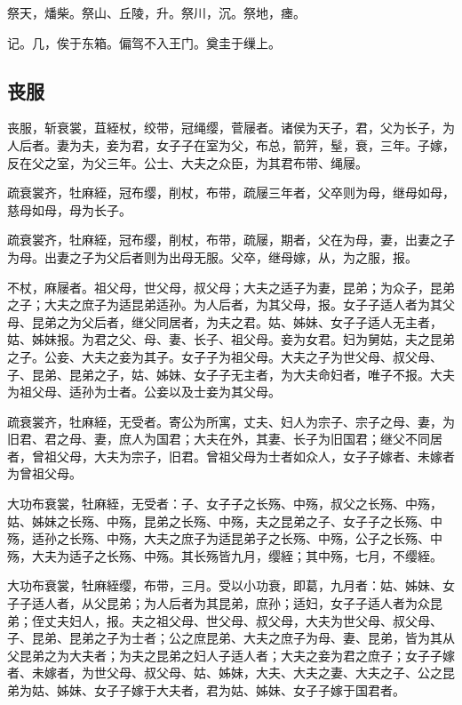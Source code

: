 \documentclass[]{article}
\begin{document}
祭天，燔柴。祭山、丘陵，升。祭川，沉。祭地，瘗。

记。几，俟于东箱。偏驾不入王门。奠圭于缫上。

\hypertarget{header-n52}{%
\subsection{丧服}\label{header-n52}}

丧服，斩衰裳，苴絰杖，绞带，冠绳缨，菅屦者。诸侯为天子，君，父为长子，为人后者。妻为夫，妾为君，女子子在室为父，布总，箭笄，髽，衰，三年。子嫁，反在父之室，为父三年。公士、大夫之众臣，为其君布带、绳屦。

疏衰裳齐，牡麻絰，冠布缨，削杖，布带，疏屦三年者，父卒则为母，继母如母，慈母如母，母为长子。

疏衰裳齐，牡麻絰，冠布缨，削杖，布带，疏屦，期者，父在为母，妻，出妻之子为母。出妻之子为父后者则为出母无服。父卒，继母嫁，从，为之服，报。

不杖，麻屦者。祖父母，世父母，叔父母；大夫之适子为妻，昆弟；为众子，昆弟之子；大夫之庶子为适昆弟适孙。为人后者，为其父母，报。女子子适人者为其父母、昆弟之为父后者，继父同居者，为夫之君。姑、姊妹、女子子适人无主者，姑、姊妹报。为君之父、母、妻、长子、祖父母。妾为女君。妇为舅姑，夫之昆弟之子。公妾、大夫之妾为其子。女子子为祖父母。大夫之子为世父母、叔父母、子、昆弟、昆弟之子，姑、姊妹、女子子无主者，为大夫命妇者，唯子不报。大夫为祖父母、适孙为士者。公妾以及士妾为其父母。

疏衰裳齐，牡麻絰，无受者。寄公为所寓，丈夫、妇人为宗子、宗子之母、妻，为旧君、君之母、妻，庶人为国君；大夫在外，其妻、长子为旧国君；继父不同居者，曾祖父母，大夫为宗子，旧君。曾祖父母为士者如众人，女子子嫁者、未嫁者为曾祖父母。

大功布衰裳，牡麻絰，无受者：子、女子子之长殇、中殇，叔父之长殇、中殇，姑、姊妹之长殇、中殇，昆弟之长殇、中殇，夫之昆弟之子、女子子之长殇、中殇，适孙之长殇、中殇，大夫之庶子为适昆弟子之长殇、中殇，公子之长殇、中殇，大夫为适子之长殇、中殇。其长殇皆九月，缨絰；其中殇，七月，不缨絰。

大功布衰裳，牡麻絰缨，布带，三月。受以小功衰，即葛，九月者：姑、姊妹、女子子适人者，从父昆弟；为人后者为其昆弟，庶孙；适妇，女子子适人者为众昆弟；侄丈夫妇人，报。夫之祖父母、世父母、叔父母，大夫为世父母、叔父母、子、昆弟、昆弟之子为士者；公之庶昆弟、大夫之庶子为母、妻、昆弟，皆为其从父昆弟之为大夫者；为夫之昆弟之妇人子适人者；大夫之妾为君之庶子；女子子嫁者、未嫁者，为世父母、叔父母、姑、姊妹，大夫、大夫之妻、大夫之子、公之昆弟为姑、姊妹、女子子嫁于大夫者，君为姑、姊妹、女子子嫁于国君者。
\end{document}
